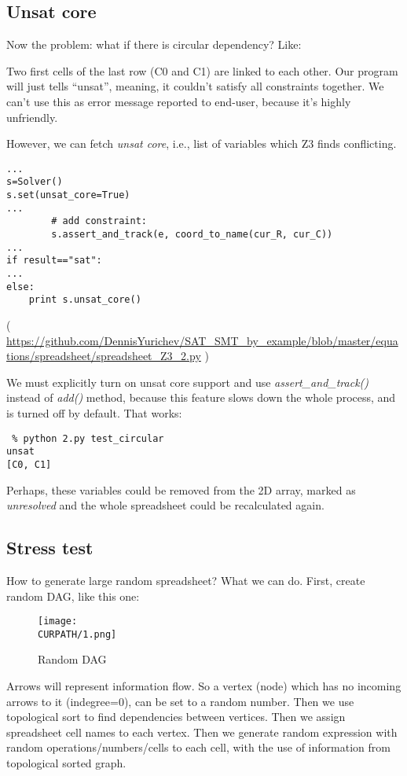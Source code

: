 \subsection{Unsat core}

Now the problem: what if there is circular dependency? Like:



Two first cells of the last row (C0 and C1) are linked to each other.
Our program will just tells ``unsat'', meaning, it couldn't satisfy all constraints together.
We can't use this as error message reported to end-user, because it's highly unfriendly.

However, we can fetch \emph{unsat core}, i.e., list of variables which Z3 finds conflicting.

\begin{lstlisting}
...
s=Solver()
s.set(unsat_core=True)
...
        # add constraint:
        s.assert_and_track(e, coord_to_name(cur_R, cur_C))
...
if result=="sat":
...
else:
    print s.unsat_core()
\end{lstlisting}

( \url{https://github.com/DennisYurichev/SAT_SMT_by_example/blob/master/equations/spreadsheet/spreadsheet_Z3_2.py} )

We must explicitly turn on unsat core support and use \emph{assert\_and\_track()} instead of \emph{add()} method,
because this feature slows down the whole process, and is turned off by default.
That works:

\begin{lstlisting}
 % python 2.py test_circular
unsat
[C0, C1]
\end{lstlisting}

Perhaps, these variables could be removed from the 2D array, marked as \emph{unresolved}
and the whole spreadsheet could be recalculated again.

\subsection{Stress test}

How to generate large random spreadsheet?
What we can do.
First, create random \ac{DAG}, like this one:

\begin{figure}[H]
\centering
\texttt{[image: \\CURPATH/1.png]}
\caption{Random \ac{DAG}}
\end{figure}

Arrows will represent information flow.
So a vertex (node) which has no incoming arrows to it (indegree=0), can be set to a random number.
Then we use topological sort to find dependencies between vertices.
Then we assign spreadsheet cell names to each vertex.
Then we generate random expression with random operations/numbers/cells to each cell,
with the use of information from topological sorted graph.

